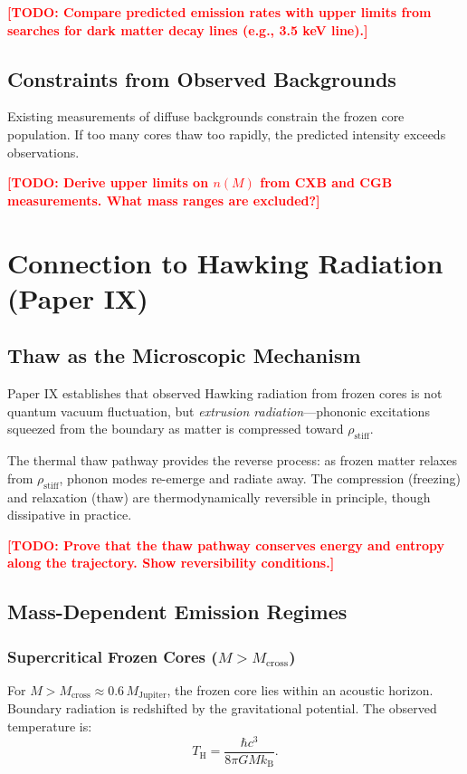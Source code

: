 \documentclass[11pt,a4paper]{article}
\newcommand{\kB}{\ensuremath{k_{\mathrm{B}}}}
\newcommand{\rhostiff}{\ensuremath{\rho_{\mathrm{stiff}}}}
\newcommand{\Mcross}{\ensuremath{M_{\mathrm{cross}}}}
\newcommand{\TH}{\ensuremath{T_{\mathrm{H}}}}
\newcommand{\TODO}[1]{\textcolor{red}{\textbf{[TODO: #1]}}}
\theoremstyle{definition}
\theoremstyle{remark}
\begin{document}
\TODO{Compare predicted emission rates with upper limits from searches for dark matter decay lines (e.g., 3.5 keV line).}

\subsection{Constraints from Observed Backgrounds}
\label{sec:constraints}

Existing measurements of diffuse backgrounds constrain the frozen core population. If too many cores thaw too rapidly, the predicted intensity exceeds observations.

\TODO{Derive upper limits on $n(M)$ from CXB and CGB measurements. What mass ranges are excluded?}

\section{Connection to Hawking Radiation (Paper IX)}
\label{sec:connection_paper9}

\subsection{Thaw as the Microscopic Mechanism}
\label{sec:thaw_mechanism}

Paper IX establishes that observed Hawking radiation from frozen cores is not quantum vacuum fluctuation, but \emph{extrusion radiation}---phononic excitations squeezed from the boundary as matter is compressed toward $\rhostiff$.

\vspace{0.5em}
\noindent
The thermal thaw pathway provides the reverse process: as frozen matter relaxes from $\rhostiff$, phonon modes re-emerge and radiate away. The compression (freezing) and relaxation (thaw) are thermodynamically reversible in principle, though dissipative in practice.

\TODO{Prove that the thaw pathway conserves energy and entropy along the trajectory. Show reversibility conditions.}

\subsection{Mass-Dependent Emission Regimes}
\label{sec:mass_regimes}

\subsubsection{Supercritical Frozen Cores ($M > \Mcross$)}
For $M > \Mcross \approx 0.6\, M_{\mathrm{Jupiter}}$, the frozen core lies within an acoustic horizon. Boundary radiation is redshifted by the gravitational potential. The observed temperature is:
\begin{equation}
\TH = \frac{\hbar c^3}{8\pi G M \kB}.
\end{equation}
\end{document}
